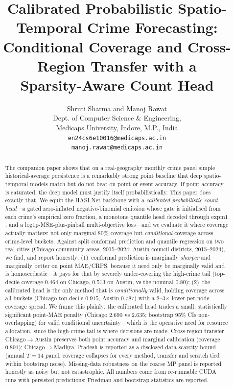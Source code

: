 \documentclass[11pt,conference]{IEEEtran}
\begin{document}
\title{Calibrated Probabilistic Spatio-Temporal Crime Forecasting:\\
Conditional Coverage and Cross-Region Transfer with a\\
Sparsity-Aware Count Head}
\author{Shruti Sharma and Manoj Rawat \\
Dept. of Computer Science \& Engineering,\\
Medicaps University, Indore, M.P., India \\
\texttt{en24cs6e10016@medicaps.ac.in} \\
\texttt{manoj.rawat@medicaps.ac.in}}
\maketitle

\begin{abstract}
The companion paper shows that on a real-geography monthly crime panel simple
historical-average persistence is a remarkably strong point baseline that deep
spatio-temporal models match but do not beat on point or event accuracy. If
point accuracy is saturated, the deep model must justify itself
probabilistically. This paper does exactly that. We equip the HASI-Net backbone
with a \emph{calibrated probabilistic count head}---a gated zero-inflated
negative-binomial emission whose gate is initialised from each crime's
empirical zero fraction, a monotone quantile head decoded through
$\mathrm{expm1}$, and a log1p-MSE-plus-pinball multi-objective loss---and we
evaluate it where coverage actually matters: not only marginal 80\% coverage but
\emph{conditional} coverage across crime-level buckets. Against split conformal
prediction and quantile regression on two real cities (Chicago community areas,
2015--2024; Austin council districts, 2015--2024), we find, and report honestly:
(1)~conformal prediction is marginally \emph{sharper} and marginally better on
point MAE/CRPS, because it need only be marginally valid and is
homoscedastic---it pays for that by severely under-covering the high-crime tail
(top-decile coverage $0.464$ on Chicago, $0.573$ on Austin, vs the nominal
$0.80$); (2)~the calibrated head is the only method that is \emph{conditionally}
valid, holding coverage across all buckets (Chicago top-decile $0.915$, Austin
$0.787$) with a 2--3$\times$ lower per-node coverage spread. We frame this
plainly: the calibrated head trades a small, statistically significant point-MAE
penalty (Chicago $2.690$ vs $2.635$; bootstrap 95\% CIs non-overlapping) for
valid conditional uncertainty---which is the operative need for resource
allocation, since the high-crime tail is where decisions are made. Cross-region
transfer Chicago$\to$Austin preserves both point accuracy and marginal
calibration (coverage $0.801$); Chicago$\to$Madhya~Pradesh is reported as a
disclosed data-scarcity bound (annual $T{=}14$ panel, coverage collapses for
every method, transfer and scratch tied within bootstrap noise). Missing-data
robustness on the coarse MP panel is reported honestly as noisy but not
catastrophic. All numbers come from re-runnable CUDA runs with persisted
predictions; Friedman and bootstrap statistics are reported.
\end{abstract}
\end{document}
